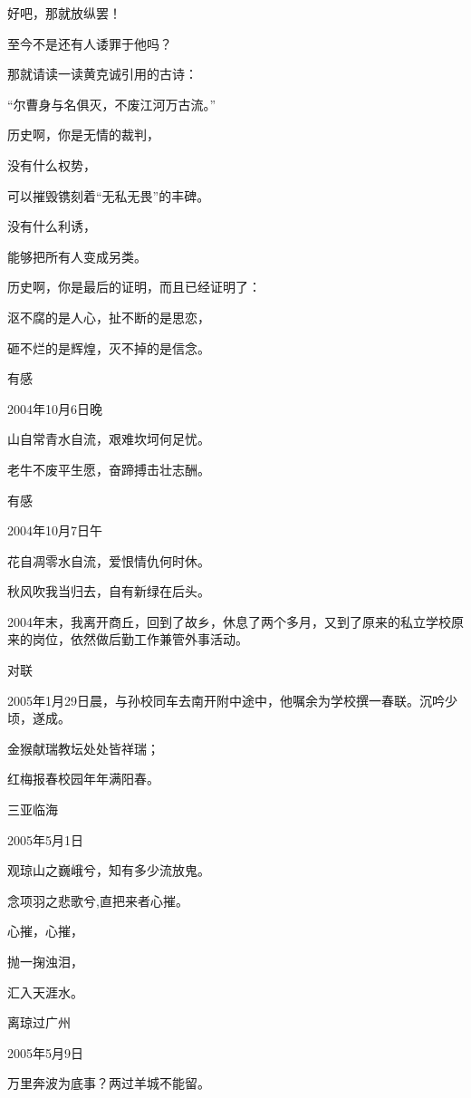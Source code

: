 \documentclass[../../dazhuan.tex]{subfiles}
\begin{document}
好吧，那就放纵罢！

至今不是还有人诿罪于他吗？

那就请读一读黄克诚引用的古诗：

“尔曹身与名俱灭，不废江河万古流。”

历史啊，你是无情的裁判，

没有什么权势，

可以摧毁镌刻着“无私无畏”的丰碑。

没有什么利诱，

能够把所有人变成另类。

历史啊，你是最后的证明，而且已经证明了：

沤不腐的是人心，扯不断的是思恋，

砸不烂的是辉煌，灭不掉的是信念。



有感

2004年10月6日晚

山自常青水自流，艰难坎坷何足忧。

老牛不废平生愿，奋蹄搏击壮志酬。



有感

2004年10月7日午

花自凋零水自流，爱恨情仇何时休。

秋风吹我当归去，自有新绿在后头。



2004年末，我离开商丘，回到了故乡，休息了两个多月，又到了原来的私立学校原来的岗位，依然做后勤工作兼管外事活动。



对联

2005年1月29日晨，与孙校同车去南开附中途中，他嘱余为学校撰一春联。沉吟少顷，遂成。

金猴献瑞教坛处处皆祥瑞；

红梅报春校园年年满阳春。



三亚临海	

2005年5月1日

观琼山之巍峨兮，知有多少流放鬼。

念项羽之悲歌兮,直把来者心摧。

心摧，心摧，

抛一掬浊泪，

汇入天涯水。	



离琼过广州

2005年5月9日

万里奔波为底事？两过羊城不能留。
\end{document}
